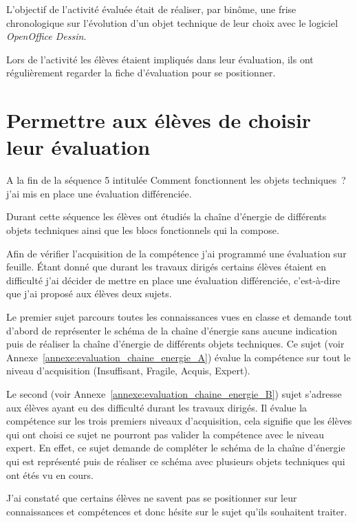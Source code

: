 L'objectif de l'activité évaluée était de réaliser, par binôme, une frise chronologique sur l'évolution d'un objet technique de leur choix avec le logiciel \textit{OpenOffice Dessin}.

Lors de l'activité les élèves étaient impliqués dans leur évaluation, ils ont régulièrement regarder la fiche d'évaluation pour se positionner.


\section{Permettre aux élèves de choisir leur évaluation}

A la fin de la séquence 5 intitulée \og Comment fonctionnent les objets techniques~?\fg j'ai mis en place une évaluation différenciée.

Durant cette séquence les élèves ont étudiés la chaîne d'énergie de différents objets techniques ainsi que les blocs fonctionnels qui la compose.

Afin de vérifier l'acquisition de la compétence j'ai programmé une évaluation sur feuille.
Étant donné que durant les travaux dirigés certains élèves étaient en difficulté j'ai décider de mettre en place une évaluation différenciée, c'est-à-dire que j'ai proposé aux élèves deux sujets.

Le premier sujet parcours toutes les connaissances vues en classe et demande tout d'abord de représenter le schéma de la chaîne d'énergie sans aucune indication puis de réaliser la chaîne d'énergie de différents objets techniques.
Ce sujet (voir Annexe~\ref{annexe:evaluation_chaine_energie_A}) évalue la compétence sur tout le niveau d'acquisition (Insuffisant, Fragile, Acquis, Expert).

Le second (voir Annexe~\ref{annexe:evaluation_chaine_energie_B}) sujet s'adresse aux élèves ayant eu des difficulté durant les travaux dirigés.
Il évalue la compétence sur les trois premiers niveaux d'acquisition, cela signifie que les élèves qui ont choisi ce sujet ne pourront pas valider la compétence avec le niveau expert.
En effet, ce sujet demande de compléter le schéma de la chaîne d'énergie qui est représenté puis de réaliser ce schéma avec plusieurs objets techniques qui ont étés vu en cours.

J'ai constaté que certains élèves ne savent pas se positionner sur leur connaissances et compétences et donc hésite sur le sujet qu'ils souhaitent traiter.



